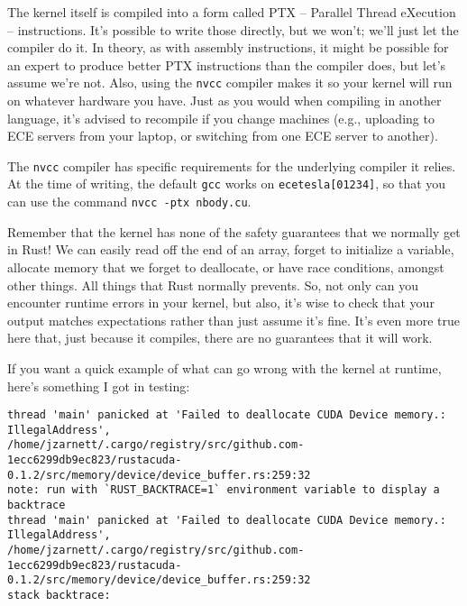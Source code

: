 The kernel itself is compiled into a form called PTX -- Parallel Thread eXecution -- instructions. It's possible to write those directly, but we won't; we'll just let the compiler do it. In theory, as with assembly instructions, it might be possible for an expert to produce better PTX instructions than the compiler does, but let's assume we're not. Also, using the \texttt{nvcc} compiler makes it so your kernel will run on whatever hardware you have. Just as you would when compiling in another language, it's advised to recompile if you change machines (e.g., uploading to ECE servers from your laptop, or switching from one ECE server to another).

The \texttt{nvcc} compiler has specific requirements for the underlying compiler it relies. At the time of writing, the default \texttt{gcc} works on \texttt{ecetesla[01234]}, so that you can use the command \texttt{nvcc -ptx nbody.cu}.

Remember that the kernel has none of the safety guarantees that we normally get in Rust! We can easily read off the end of an array, forget to initialize a variable, allocate memory that we forget to deallocate, or have race conditions, amongst other things. All things that Rust normally prevents. So, not only can you encounter runtime errors in your kernel, but also, it's wise to check that your output matches expectations rather than just assume it's fine. It's even more true here that, just because it compiles, there are no guarantees that it will work.

If you want a quick example of what can go wrong with the kernel at runtime, here's something I got in testing:
{\scriptsize
\begin{verbatim}
thread 'main' panicked at 'Failed to deallocate CUDA Device memory.: IllegalAddress', 
/home/jzarnett/.cargo/registry/src/github.com-1ecc6299db9ec823/rustacuda-0.1.2/src/memory/device/device_buffer.rs:259:32
note: run with `RUST_BACKTRACE=1` environment variable to display a backtrace
thread 'main' panicked at 'Failed to deallocate CUDA Device memory.: IllegalAddress', 
/home/jzarnett/.cargo/registry/src/github.com-1ecc6299db9ec823/rustacuda-0.1.2/src/memory/device/device_buffer.rs:259:32
stack backtrace:
\end{verbatim}
}


